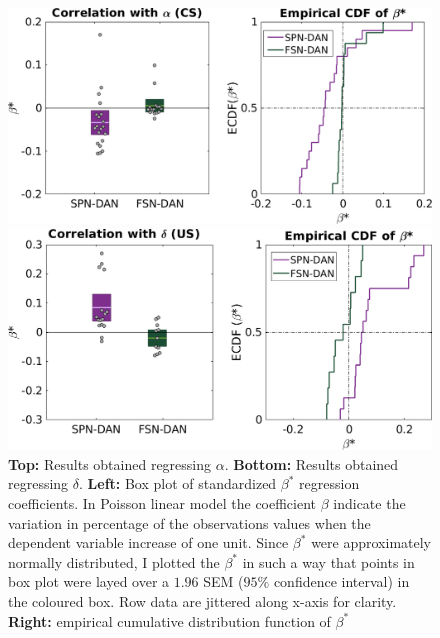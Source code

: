 \begin{figure}[H]
    \centering
    \includegraphics[scale=0.46]{figures/alphaRegrNew3.png}
    
    \vspace{1cm}
    \includegraphics[scale=0.46]{figures/deltaRegr3.png}
    \caption{\textbf{Top:} Results obtained regressing $\alpha$. \textbf{Bottom:} Results obtained regressing $\delta$. \textbf{Left:} Box plot of standardized $\beta^*$ regression coefficients. In Poisson linear model the coefficient $\beta$ indicate the variation in percentage of the observations values when the dependent variable increase of one unit. Since $\beta^*$ were approximately normally distributed, I plotted the $\beta^*$ in such a way that points in box plot were layed over a $1.96$ SEM ($95\%$ confidence interval) in the coloured box. Row data are jittered along x-axis for clarity. \textbf{Right:} empirical cumulative distribution function of $\beta^*$}
    \label{fig:AlphaDeltaReg}
\end{figure}
